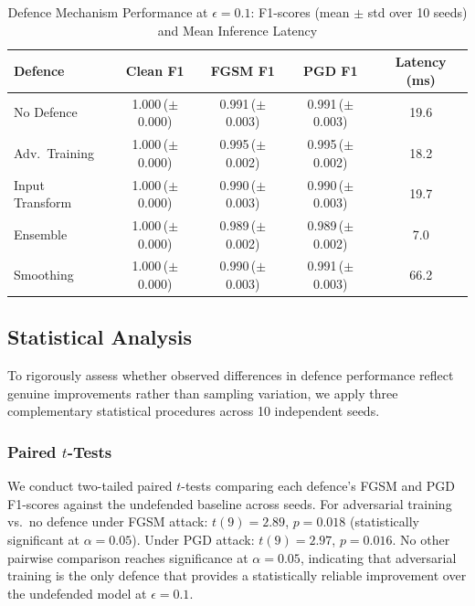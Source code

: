 \documentclass[conference]{IEEEtran}
\begin{document}
\begin{table}[htbp]
\centering
\caption{Defence Mechanism Performance at $\epsilon = 0.1$: F1-scores (mean $\pm$ std over 10 seeds) and Mean Inference Latency}
\label{tab:results}
\setlength{\tabcolsep}{4pt}
\begin{tabular}{lcccc}
\toprule
\textbf{Defence} & \textbf{Clean F1} & \textbf{FGSM F1} & \textbf{PGD F1} & \textbf{Latency (ms)} \\
\midrule
No Defence        & 1.000\,($\pm$0.000) & 0.991\,($\pm$0.003) & 0.991\,($\pm$0.003) & 19.6 \\
Adv.\ Training   & 1.000\,($\pm$0.000) & 0.995\,($\pm$0.002) & 0.995\,($\pm$0.002) & 18.2 \\
Input Transform   & 1.000\,($\pm$0.000) & 0.990\,($\pm$0.003) & 0.990\,($\pm$0.003) & 19.7 \\
Ensemble          & 1.000\,($\pm$0.000) & 0.989\,($\pm$0.002) & 0.989\,($\pm$0.002) &  7.0 \\
Smoothing         & 1.000\,($\pm$0.000) & 0.990\,($\pm$0.003) & 0.991\,($\pm$0.003) & 66.2 \\
\bottomrule
\end{tabular}
\end{table}

\subsection{Statistical Analysis}

To rigorously assess whether observed differences in defence performance reflect genuine improvements rather than sampling variation, we apply three complementary statistical procedures across 10 independent seeds.

\subsubsection{Paired $t$-Tests}

We conduct two-tailed paired $t$-tests comparing each defence's FGSM and PGD F1-scores against the undefended baseline across seeds. For adversarial training vs.\ no defence under FGSM attack: $t(9) = 2.89$, $p = 0.018$ (statistically significant at $\alpha = 0.05$). Under PGD attack: $t(9) = 2.97$, $p = 0.016$. No other pairwise comparison reaches significance at $\alpha = 0.05$, indicating that adversarial training is the only defence that provides a statistically reliable improvement over the undefended model at $\epsilon = 0.1$.
\end{document}
